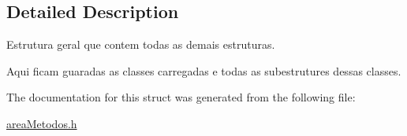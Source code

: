 \subsection{Detailed Description}
Estrutura geral que contem todas as demais estruturas. 

Aqui ficam guaradas as classes carregadas e todas as subestrutures dessas classes. 

The documentation for this struct was generated from the following file\+:\begin{DoxyCompactItemize}
\item 
\mbox{\hyperlink{areaMetodos_8h}{area\+Metodos.\+h}}\end{DoxyCompactItemize}

